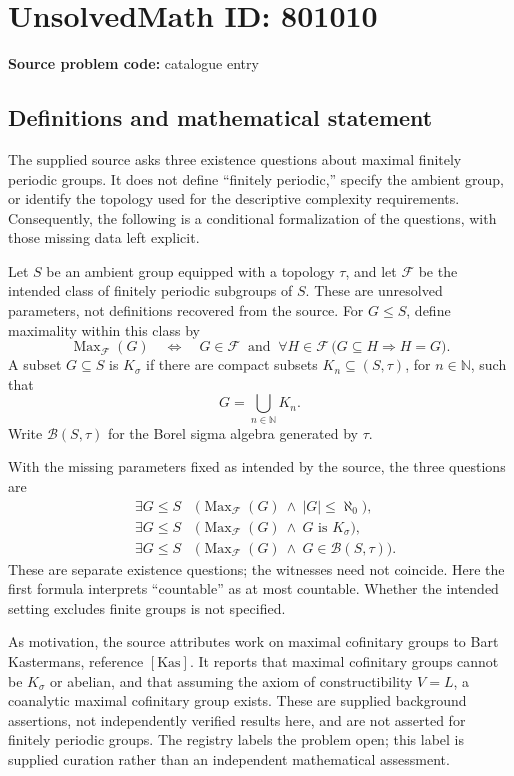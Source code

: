 \documentclass[11pt]{article}
\newcommand{\N}{\mathbb{N}}
\begin{document}
\section*{UnsolvedMath ID: 801010}
\textbf{Source problem code:} catalogue entry
\subsection{Definitions and mathematical statement}
The supplied source asks three existence questions about maximal finitely periodic groups. It does not define ``finitely periodic,'' specify the ambient group, or identify the topology used for the descriptive complexity requirements. Consequently, the following is a conditional formalization of the questions, with those missing data left explicit.

Let \(S\) be an ambient group equipped with a topology \(\tau\), and let \(\mathcal F\) be the intended class of finitely periodic subgroups of \(S\). These are unresolved parameters, not definitions recovered from the source. For \(G\leq S\), define maximality within this class by
\[
\operatorname{Max}_{\mathcal F}(G)
\quad\Longleftrightarrow\quad
G\in\mathcal F\ \text{ and }\ 
\forall H\in\mathcal F\,
\bigl(G\subseteq H\Longrightarrow H=G\bigr).
\]
A subset \(G\subseteq S\) is \(K_\sigma\) if there are compact subsets \(K_n\subseteq(S,\tau)\), for \(n\in\N\), such that
\[
G=\bigcup_{n\in\N}K_n.
\]
Write \(\mathcal B(S,\tau)\) for the Borel sigma algebra generated by \(\tau\).

With the missing parameters fixed as intended by the source, the three questions are
\begin{align*}
&\exists G\leq S\quad
\bigl(\operatorname{Max}_{\mathcal F}(G)\ \land\ |G|\leq\aleph_0\bigr),\\
&\exists G\leq S\quad
\bigl(\operatorname{Max}_{\mathcal F}(G)\ \land\ G\text{ is }K_\sigma\bigr),\\
&\exists G\leq S\quad
\bigl(\operatorname{Max}_{\mathcal F}(G)\ \land\ G\in\mathcal B(S,\tau)\bigr).
\end{align*}
These are separate existence questions; the witnesses need not coincide. Here the first formula interprets ``countable'' as at most countable. Whether the intended setting excludes finite groups is not specified.

As motivation, the source attributes work on maximal cofinitary groups to Bart Kastermans, reference \([\mathrm{Kas}]\). It reports that maximal cofinitary groups cannot be \(K_\sigma\) or abelian, and that assuming the axiom of constructibility \(V=L\), a coanalytic maximal cofinitary group exists. These are supplied background assertions, not independently verified results here, and are not asserted for finitely periodic groups. The registry labels the problem open; this label is supplied curation rather than an independent mathematical assessment.
\end{document}
